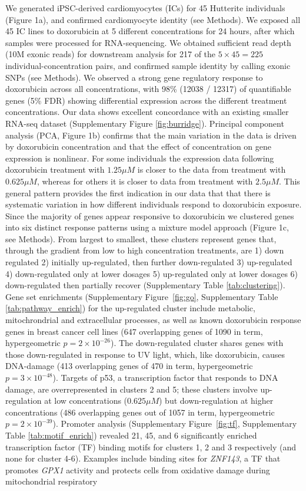 \documentclass{article}
\begin{document}
We generated iPSC-derived cardiomyocytes (ICs) for 45 Hutterite individuals (Figure 1a), and confirmed cardiomyocyte identity (see Methods). We exposed all 45 IC lines to doxorubicin at 5 different concentrations for 24 hours, after which samples were processed for RNA-sequencing. We obtained sufficient read depth (10M exonic reads) for downstream analysis for 217 of the $5 \times 45 = 225$ individual-concentration pairs, and confirmed sample identity by calling exonic SNPs (see Methods). We observed a strong gene regulatory response to doxorubicin across all concentrations, with 98\% (12038 / 12317) of quantifiable genes (5\% FDR) showing differential expression across the different treatment concentrations. Our data shows excellent concordance with an existing smaller RNA-seq dataset\cite{Burridge2016} (Supplementary Figure \ref{fig:burridge}). Principal component analysis (PCA, Figure 1b) confirms that the main variation in the data is driven by doxorubicin concentration and that the effect of concentration on gene expression is nonlinear. For some individuals the expression data following doxorubicin treatment with $1.25\mu M$ is closer to the data from treatment with $0.625 \mu M$, whereas for others it is closer to data from treatment with $2.5\mu M$. This general pattern provides the first indication in our data that that there is systematic variation in how different individuals respond to doxorubicin exposure. Since the majority of genes appear responsive to doxorubicin we clustered genes into six distinct response patterns using a mixture model approach (Figure 1c, see Methods). From largest to smallest, these clusters represent genes that, through the gradient from low to high concentration treatments, are  1) down regulated 2) initially up-regulated, then further down-regulated 3) up-regulated 4) down-regulated only at lower dosages 5) up-regulated only at lower dosages 6) down-regulated then partially recover (Supplementary Table \ref{tab:clustering}). Gene set enrichments (Supplementary Figure~\ref{fig:go}, Supplementary Table \ref{tab:pathway_enrich}) for the up-regulated cluster include metabolic, mitochrondrial and extracellular processes, as well as known doxorubicin response genes in breast cancer cell lines \cite{graessmann2007chemotherapy} (647 overlapping genes of 1090 in term, hypergeometric $p=2 \times 10^{-26}$). The down-regulated cluster shares genes with those down-regulated in response to UV light, which, like doxorubicin, causes DNA-damage (413 overlapping genes of 470 in term, hypergeometric $p=3 \times 10^{-48}$). Targets of p53, a transcription factor that responds to DNA damage, are overrepresented in clusters 2 and 5; these clusters involve up-regulation at low concentrations ($0.625\mu M$) but down-regulation at higher concentrations (486 overlapping genes out of 1057 in term, hypergeometric $p=2 \times 10^{-39}$). Promoter analysis (Supplementary Figure~\ref{fig:tf}, Supplementary Table \ref{tab:motif_enrich}) revealed 21, 45, and 6 significantly enriched transcription factor (TF) binding motifs for clusters 1, 2 and 3 respectively (and none for cluster 4-6). Examples include binding sites for \emph{ZNF143}, a TF that promotes \emph{GPX1} activity and protects cells from oxidative damage during mitochondrial respiratory 
\end{document}
